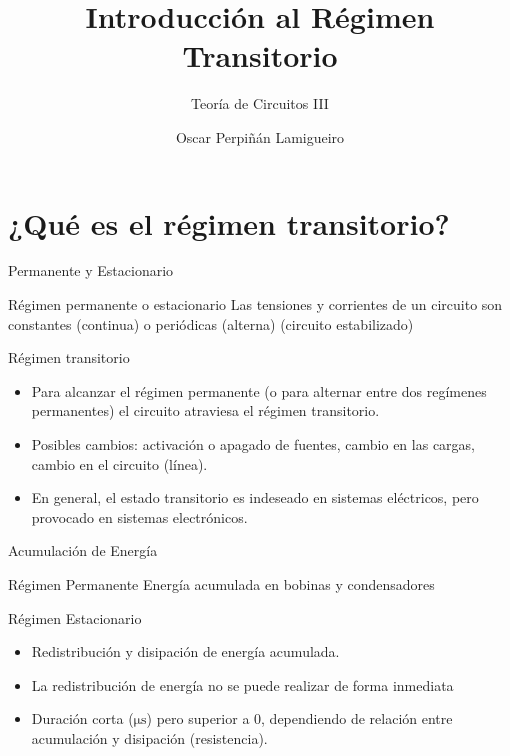 \documentclass[aspectratio=169, usenames,svgnames,dvipsnames]{beamer}
\author{Oscar Perpiñán Lamigueiro}
\date{}
\title{Introducción al Régimen Transitorio}
\subtitle{Teoría de Circuitos III}
\begin{document}
\maketitle

\section{¿Qué es el régimen transitorio?}
\label{sec:org4e587a8}
\begin{frame}[label={sec:org55c3c52}]{Permanente y Estacionario}
\begin{block}{Régimen permanente o estacionario}
Las tensiones y corrientes de un circuito son constantes (continua) o periódicas (alterna) (circuito estabilizado)
\end{block}
\begin{block}{Régimen transitorio}
\begin{itemize}
\item Para alcanzar el régimen permanente (o para alternar entre dos regímenes permanentes) el circuito atraviesa el régimen transitorio.
\item Posibles cambios: activación o apagado de fuentes, cambio en las cargas, cambio en el circuito (línea).
\item En general, el estado transitorio es indeseado en sistemas eléctricos, pero provocado en sistemas electrónicos.
\end{itemize}
\end{block}
\end{frame}

\begin{frame}[label={sec:orga5fc571}]{Acumulación de Energía}
\begin{block}{Régimen Permanente}
\alert{Energía acumulada} en \alert{bobinas} y \alert{condensadores}
\end{block}
\begin{block}{Régimen Estacionario}
\begin{itemize}
\item \alert{Redistribución} y \alert{disipación} de energía acumulada.
\item La redistribución de energía \alert{no} se puede realizar de forma \alert{inmediata}
\item \alert{Duración corta} (\(\si{\micro\second}\)) pero superior a 0, dependiendo de \alert{relación entre acumulación y disipación} (resistencia).
\end{itemize}
\end{block}
\end{frame}
\end{document}
